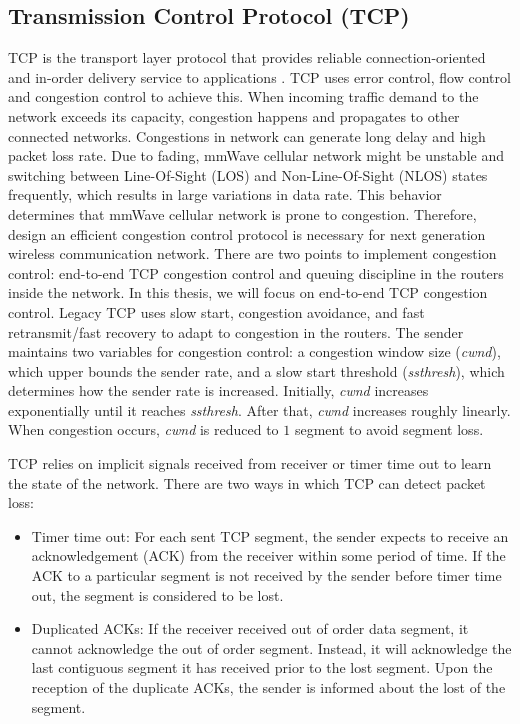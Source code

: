 \subsection{Transmission Control Protocol (TCP)}
\par TCP is the transport layer protocol that provides reliable connection-oriented and in-order delivery service to applications \cite{panwar2004tcp}. TCP uses error control, flow control and congestion control to achieve this. When incoming traffic demand to the network exceeds its capacity, congestion happens and propagates to other connected networks. Congestions in network can generate long delay and high packet loss rate. Due to fading, mmWave cellular network might be unstable and switching between Line-Of-Sight (LOS) and Non-Line-Of-Sight (NLOS) states frequently, which results in large variations in data rate. This behavior determines that mmWave cellular network is prone to congestion. Therefore, design an efficient congestion control protocol is necessary for next generation wireless communication network. There are two points to implement congestion control: end-to-end TCP congestion control and queuing discipline in the routers inside the network. In this thesis, we will focus on end-to-end TCP congestion control. Legacy TCP uses slow start, congestion avoidance, and fast retransmit/fast recovery to adapt to congestion in the routers. The sender maintains two variables for congestion control: a congestion window size (\emph{cwnd}), which upper bounds the sender rate, and a slow start threshold (\emph{ssthresh}), which determines how the sender rate is increased. Initially, \emph{cwnd} increases exponentially until it reaches \emph{ssthresh}. After that, \emph{cwnd} increases roughly linearly. When congestion occurs, \emph{cwnd} is reduced to $1$ segment to avoid segment loss. 
\par TCP relies on implicit signals received from receiver or timer time out to learn the state of the network. There are two ways in which TCP can detect packet loss: 
\begin{itemize}
\item Timer time out: For each sent TCP segment, the sender expects to receive an acknowledgement (ACK) from the receiver within some period of time. If the ACK to a particular segment is not received by the sender before timer time out, the segment is considered to be lost. 
\item Duplicated ACKs: If the receiver received out of order data segment, it cannot acknowledge the out of order segment. Instead, it will acknowledge the last contiguous segment it has received prior to the lost segment. Upon the reception of the duplicate ACKs, the sender is informed about the lost of the segment.
\end{itemize}
